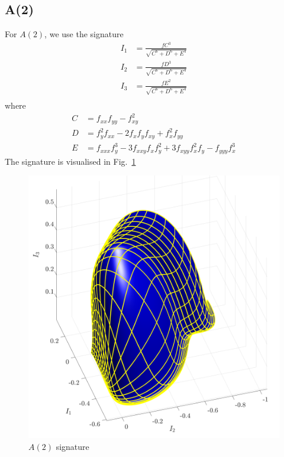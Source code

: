 \documentclass[11pt]{article}
\begin{document}
\subsection{A(2)}
For $A(2)$, we use the signature
\begin{equation}\label{eq:a2sig}
  \begin{split}
    I_1 &= \frac{fC^3}{\sqrt{C^6 + D^6 + E^4}} \\
    I_2 &= \frac{fD^3}{\sqrt{C^6 + D^6 + E^4}} \\
    I_3 &= \frac{fE^2}{\sqrt{C^6 + D^6 + E^4}} \\
  \end{split}
\end{equation}
where
\begin{equation*}
  \begin{split}
    C &= f_{xx}f_{yy} - f_{xy}^2 \\
    D &= f_y^2f_{xx} - 2f_xf_y f_{xy} + f_x^2f_{yy} \\
    E &= f_{xxx}f_y^3 - 3f_{xxy}f_x f_y^2 + 3f_{xyy}f_x^2 f_y - f_{yyy}f_x^3
  \end{split}
\end{equation*}
The signature is visualised in Fig.~\ref{fig:a2signature}
\begin{figure}
  \centering
    \includegraphics[width=12cm]{figures/A2_signature}
  \caption{$A(2)$ signature}
  \label{fig:a2signature}
\end{figure}
\end{document}
